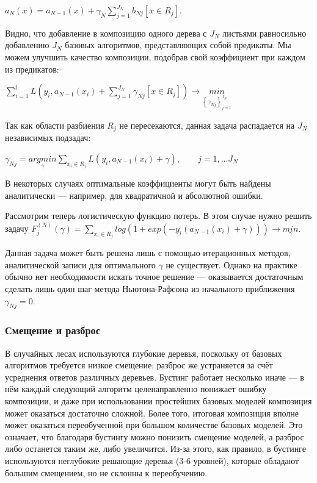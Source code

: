 \documentclass{article}
\begin{document}
$a_N(x) = a_{N-1}(x) + \gamma_N \sum_{j=1}^{J_N}b_{Nj}[x\in R_j]$.

Видно, что добавление в композицию одного дерева с $J_N$ листьями равносильно добавлению $J_N$ базовых алгоритмов, представляющих собой предикаты. Мы можем улучшить качество композиции, подобрав свой коэффициент при каждом из предикатов: 

$\sum_{i=1}^{l} L\left(y_i,a_{N-1}(x_i) + \sum_{j=1}^{J_N} \gamma_{Nj}[x\in R_j]\right) \rightarrow \underset{\left\{\gamma_{Nj}\right\}^{J_N}_{j=1}}{min}$

Так как области разбиения $R_j$ не пересекаются, данная задача распадается на $J_N$ независимых подзадач:

$\gamma_{Nj} = \underset{\gamma}{argmin} \sum_{x_i \in R_j} L(y_i, a_{N-1}(x_i) + \gamma), \qquad j=1,\ldots J_N$

В некоторых случаях оптимальные коэффициенты могут быть найдены аналитически --- например, для квадратичной и абсолютной ошибки.

Рассмотрим теперь логистическую функцию потерь. В этом случае нужно решить задачу
$F_j^{(N)}(\gamma) = \sum_{x_i \in R_j} log(1 + exp(-y_i(a_{N-1}(x_i) + \gamma))) \rightarrow \underset{\gamma}{min}$.

Данная задача может быть решена лишь с помощью итерационных методов, аналитической записи для оптимального $\gamma$ не существует. Однако на практике обычно нет необходимости искать точное решение — оказывается достаточным сделать лишь один шаг метода Ньютона-Рафсона из начального приближения $\gamma_{Nj} = 0$. 

\subsubsection{Смещение и разброс}

В случайных лесах используются глубокие деревья, поскольку от базовых алгоритмов требуется низкое смещение; разброс же устраняется за счёт усреднения ответов различных деревьев. Бустинг работает несколько иначе — в
нём каждый следующий алгоритм целенаправленно понижает ошибку композиции, и даже при использовании простейших базовых моделей композиция может оказаться достаточно сложной. Более того, итоговая композиция вполне может оказаться переобученной при большом количестве базовых моделей. Это означает, что благодаря бустингу можно понизить смещение моделей, а разброс либо останется таким же, либо увеличится. Из-за этого, как правило, в бустинге используются неглубокие решающие деревья (3-6 уровней), которые обладают большим смещением, но не
склонны к переобучению.
\end{document}
